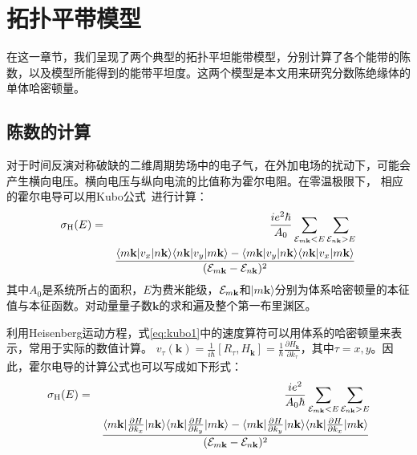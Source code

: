 \chapter{拓扑平带模型}
\label{sec:models}
在这一章节，我们呈现了两个典型的拓扑平坦能带模型，分别计算了各个能带的陈数，以及模型所能得到的能带平坦度。这两个模型是本文用来研究分数陈绝缘体的单体哈密顿量。


\section{陈数的计算}
对于时间反演对称破缺的二维周期势场中的电子气，在外加电场的扰动下，可能会产生横向电压。横向电压与纵向电流的比值称为霍尔电阻。在零温极限下，
相应的霍尔电导可以用Kubo公式~\cite{Thouless1982}进行计算：
\begin{eqnarray}
    \sigma_{\rm
H}({E})&=&\frac{{i}e^{2}\hbar}{{A}_0}\sum_{{\cal
E}_{{m\mathbf{k}}}<E}\sum_{{\cal E}_{{n\mathbf{k}}}>E}\nonumber\\%
&&\frac{\langle{m\mathbf{k}}|{v}_{{x}}|{n\mathbf{k}}\rangle\langle{n\mathbf{k}}|{v}_{{y}}|{m\mathbf{k}}\rangle
-\langle{m\mathbf{k}}|{v}_{{y}}|{n\mathbf{k}}\rangle\langle{n\mathbf{k}}|{v}_{{x}}|{m\mathbf{k}}\rangle}{({\cal
E}_{{m\mathbf{k}}}-{\cal E}_{{n\mathbf{k}}})^{2}}
\label{eq:kubo1}
\end{eqnarray}
其中$A_{0}$是系统所占的面积，$E$为费米能级，${\cal E}_{m\mathbf{k}}$和$|m\mathbf{k}\rangle$分别为体系哈密顿量的本征值与本征函数。对动量量子数$\mathbf{k}$的求和遍及整个第一布里渊区。

利用Heisenberg运动方程，式\eqref{eq:kubo1}中的速度算符可以用体系的哈密顿量来表示，常用于实际的数值计算。
$v_{\tau}(\mathbf{k})
=\frac{1}{i\hbar} [R_\tau, H_{\mathbf{k}}]
=\frac{1}{\hbar}\frac{\partial{H_{\mathbf{k}}}}{\partial{k_{\tau}}}$，其中$\tau=x,y$。因此，霍尔电导的计算公式也可以写成如下形式：
\begin{eqnarray}
    \sigma_{\rm
H}({E})&=&\frac{{i}e^{2}}{{A}_0\hbar}\sum_{{\cal
E}_{{m\mathbf{k}}}<E}\sum_{{\cal E}_{{n\mathbf{k}}}>E}\nonumber\\%
&&\frac{\langle{m\mathbf{k}}|\frac{\partial{H}}{\partial{k_{x}}}|{n\mathbf{k}}\rangle\langle{n\mathbf{k}}|\frac{\partial{H}}{\partial{k_{y}}}|{m\mathbf{k}}\rangle
-\langle{m\mathbf{k}}|\frac{\partial{H}}{\partial{k_{y}}}|{n\mathbf{k}}\rangle\langle{n\mathbf{k}}|\frac{\partial{H}}{\partial{k_{x}}}|{m\mathbf{k}}\rangle}{({\cal
E}_{{m\mathbf{k}}}-{\cal E}_{{n\mathbf{k}}})^{2}}
\label{eq:kubo2}
\end{eqnarray}


